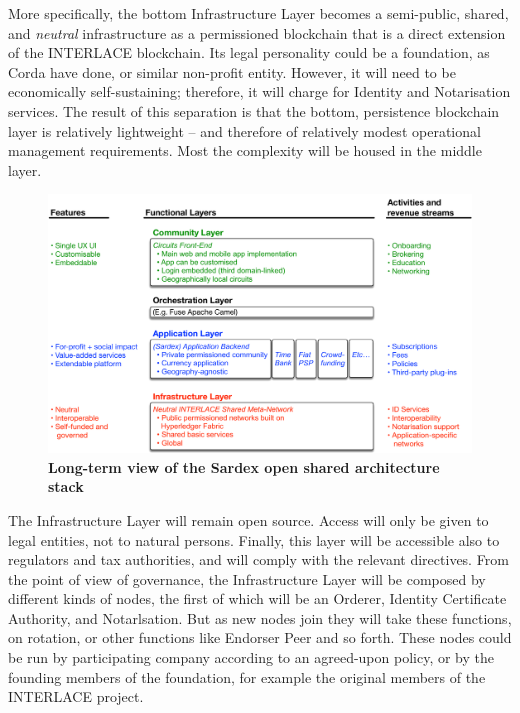 More specifically, the bottom Infrastructure Layer becomes a semi-public, shared, and \emph{neutral} infrastructure as a permissioned blockchain that is a direct extension of the INTERLACE blockchain. Its legal personality could be a foundation, as Corda have done, or similar non-profit entity. However, it will need to be economically self-sustaining; therefore, it will charge for Identity and Notarisation services. The result of this separation is that the bottom, persistence blockchain layer is relatively lightweight -- and therefore of relatively modest operational management requirements. Most the complexity will be housed in the middle layer.

\begin{figure}[h]
\centering
\includegraphics[width=17 cm]{Figures/Open_Shared_Architecture}
\vspace{0.1cm}
\caption{\bf \small Long-term view of the Sardex open shared architecture stack}
\label{fig:OpenArchitecture}
\end{figure}

The Infrastructure Layer will remain open source. Access will only be given to legal entities, not to natural persons. Finally, this layer will be accessible also to regulators and tax authorities, and will comply with the relevant directives. From the point of view of governance, the Infrastructure Layer will be composed by different kinds of nodes, the first of which will be an Orderer, Identity Certificate Authority, and Notarlsation. But as new nodes join they will take these functions, on rotation, or other functions like Endorser Peer and so forth. These nodes could be run by participating company according to an agreed-upon policy, or by the founding members of the foundation, for example the original members of the INTERLACE project.

